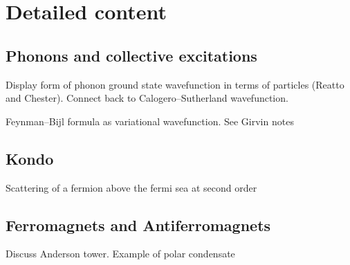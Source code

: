\section{Detailed content}

\subsection{Phonons and collective excitations}

Display form of phonon ground state wavefunction in terms of particles (Reatto and Chester). Connect back to Calogero--Sutherland wavefunction. 

Feynman--Bijl formula as variational wavefunction. See Girvin notes

\subsection{Kondo}

Scattering of a fermion above the fermi sea at second order

\subsection{Ferromagnets and Antiferromagnets}

Discuss Anderson tower. Example of polar condensate
